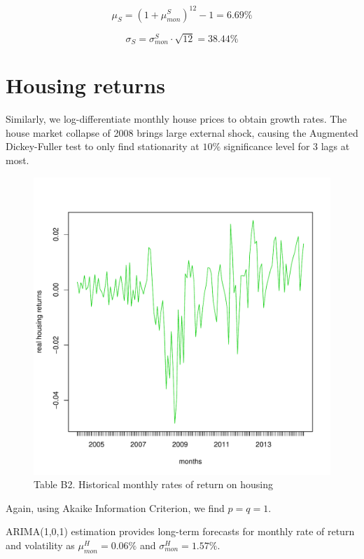 \begin{equation}
	\mu_S = (1 + \mu^S_{mon})^{12} - 1= 6.69\%
\end{equation}

\begin{equation}
	\sigma_S = \sigma^S_{mon} \cdot \sqrt{12} = 38.44\%
\end{equation}

\section{Housing returns}
\label{paramcaliby}
Similarly, we log-differentiate monthly house prices to obtain growth rates. The house market collapse of 2008 brings large external shock, causing the Augmented Dickey-Fuller test to only find stationarity at $10\%$ significance level for 3 lags at most.

\begin{figure}[h!]
	\centering
	\includegraphics[scale=0.3]{figs/reidindiff.pdf}
	\caption*{Table B2. Historical monthly rates of return on housing}
	\label{fig:reidindiff}
\end{figure}

Again, using Akaike Information Criterion, we find $p=q=1$.

ARIMA(1,0,1) estimation provides long-term forecasts for monthly rate of return and volatility as $\mu^H_{mon} = 0.06\%$ and $\sigma^H_{mon} = 1.57\%$.

